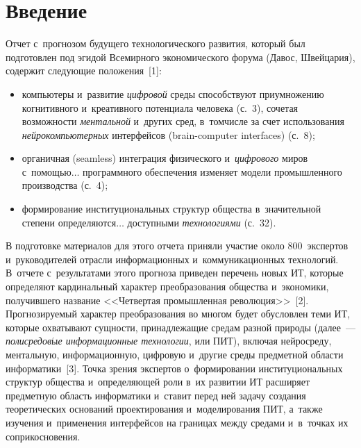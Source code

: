 
  
\vspace*{3pt}



\thispagestyle{headings}

\begin{multicols}{2}

\label{st\stat}
    
\section{Введение}


  Отчет с~прогнозом будущего технологического развития, который был 
подготовлен под эгидой Всемирного экономического форума (Давос, 
Швейцария), содержит следующие положения~[1]:
  \begin{itemize}
  \item компьютеры и~развитие \textit{цифровой} среды способствуют 
приумножению когнитивного и~креативного потенциала человека (с.~3), 
сочетая возможности \textit{ментальной} и~других сред, в~том\linebreak чис\-ле за счет 
использования \textit{нейрокомпьютерных} интерфейсов (brain-computer 
interfaces) (с.~8);\\[-15pt]
  \item органичная (seamless) интеграция физического и~\textit{цифрового} 
миров с~помощью$\ldots$ программного обеспечения изменяет модели 
промышленного производства (с.~4);\\[-15pt]
  \item формирование институциональных структур общества 
в~значительной степени опре\-де\-ля\-ют\-ся$\ldots$ доступными 
\textit{технологиями} (с.~32).
  \end{itemize}
  
  В подготовке материалов для этого отчета приняли участие около 
800~экспертов и~руководителей отрасли информационных 
и~коммуникационных технологий. В~отчете с~результатами этого прогноза 
приведен перечень новых ИТ, которые 
определяют кардинальный характер преобразования общества и~экономики, 
получившего название <<Четвертая промышленная революция>>~[2]. 
Прогнозируемый характер преобразования во многом будет обуслов\-лен теми 
ИТ, которые охватывают сущности, принадлежащие средам разной природы 
(далее~--- \textit{полисредов$\acute{\mbox{ы}}$е информационные 
технологии}, или ПИТ), включая нейросреду, ментальную, 
информационную, циф\-ро\-вую и~другие среды предметной об\-ласти 
информатики~[3]. Точка зрения экспертов о~формировании 
институциональных структур общества и~определяющей роли в~их развитии 
ИТ расширяет предметную об\-ласть информатики 
и~ставит перед ней задачу создания тео\-ре\-ти\-че\-ских оснований 
проектирования и~моделирования ПИТ, а~также изучения и~применения 
интерфейсов на границах между средами и~в~точках их соприкосновения.
  

\end{multicols}
